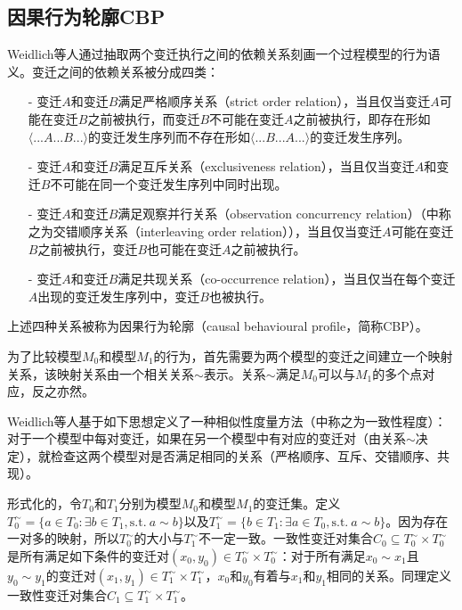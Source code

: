 \subsection{因果行为轮廓CBP}\label{subsec:cbp}
Weidlich等人通过抽取两个变迁执行之间的依赖关系刻画一个过程模型的行为语义\cite{weidlich2011efficient,weidlich2010efficient}。变迁之间的依赖关系被分成四类：
\begin{itemize}
  \item[-] 变迁$A$和变迁$B$满足严格顺序关系（strict order relation），当且仅当变迁$A$可能在变迁$B$之前被执行，而变迁$B$不可能在变迁$A$之前被执行，即存在形如$\langle ...A...B...\rangle$的变迁发生序列而不存在形如$\langle ...B...A...\rangle$的变迁发生序列。
  \item[-] 变迁$A$和变迁$B$满足互斥关系（exclusiveness relation），当且仅当变迁$A$和变迁$B$不可能在同一个变迁发生序列中同时出现。
  \item[-] 变迁$A$和变迁$B$满足观察并行关系（observation concurrency relation）（中称之为交错顺序关系（interleaving order relation）），当且仅当变迁$A$可能在变迁$B$之前被执行，变迁$B$也可能在变迁$A$之前被执行。
  \item[-] 变迁$A$和变迁$B$满足共现关系（co-occurrence relation），当且仅当在每个变迁$A$出现的变迁发生序列中，变迁$B$也被执行。
\end{itemize}
上述四种关系被称为因果行为轮廓（causal behavioural profile，简称CBP）。

为了比较模型$M_{0}$和模型$M_{1}$的行为，首先需要为两个模型的变迁之间建立一个映射关系，该映射关系由一个相关关系$\sim$表示。关系$\sim$满足$M_{0}$可以与$M_{1}$的多个点对应，反之亦然。

Weidlich等人基于如下思想定义了一种相似性度量方法（中称之为一致性程度）：对于一个模型中每对变迁，如果在另一个模型中有对应的变迁对（由关系$\sim$决定），就检查这两个模型对是否满足相同的关系（严格顺序、互斥、交错顺序、共现）。

形式化的，令$T_{0}$和$T_{1}$分别为模型$M_{0}$和模型$M_{1}$的变迁集。定义$T_{0}^{\sim}=\{a\in T_{0}:\exists b\in T_{1},\text{s.t.}~a\sim b\}$以及$T_{1}^{\sim}=\{b\in T_{1}:\exists a\in T_{0},\text{s.t.}~a\sim b\}$。因为存在一对多的映射，所以$T_{0}^{\sim}$的大小与$T_{1}^{\sim}$不一定一致。一致性变迁对集合$C_{0}\subseteq T_{0}^{\sim}\times T_{0}^{\sim}$是所有满足如下条件的变迁对$(x_{0},y_{0})\in T_{0}^{\sim}\times T_{0}^{\sim}$：对于所有满足$x_{0}\sim x_{1}$且$y_{0}\sim y_{1}$的变迁对$(x_{1},y_{1})\in T_{1}^{\sim}\times T_{1}^{\sim}$，$x_{0}$和$y_{0}$有着与$x_{1}$和$y_{1}$相同的关系。同理定义一致性变迁对集合$C_{1}\subseteq T_{1}^{\sim}\times T_{1}^{\sim}$。

